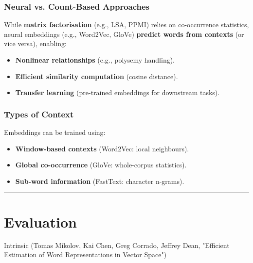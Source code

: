 \documentclass[
]{article}
\providecommand{\tightlist}{%
  \setlength{\itemsep}{0pt}\setlength{\parskip}{0pt}}
\begin{document}
\hypertarget{neural-vs.-count-based-approaches}{%
\subsubsection{\texorpdfstring{\textbf{Neural vs. Count-Based
Approaches}}{Neural vs. Count-Based Approaches}}\label{neural-vs.-count-based-approaches}}

While \textbf{matrix factorisation} (e.g., LSA, PPMI) relies on
co-occurrence statistics, neural embeddings (e.g., Word2Vec, GloVe)
\textbf{predict words from contexts} (or vice versa), enabling:

\begin{itemize}
\tightlist
\item
  \textbf{Nonlinear relationships} (e.g., polysemy handling).
\item
  \textbf{Efficient similarity computation} (cosine distance).
\item
  \textbf{Transfer learning} (pre-trained embeddings for downstream
  tasks).
\end{itemize}

\hypertarget{types-of-context}{%
\subsubsection{\texorpdfstring{\textbf{Types of
Context}}{Types of Context}}\label{types-of-context}}

Embeddings can be trained using:

\begin{itemize}
\tightlist
\item
  \textbf{Window-based contexts} (Word2Vec: local neighbours).
\item
  \textbf{Global co-occurrence} (GloVe: whole-corpus statistics).
\item
  \textbf{Sub-word information} (FastText: character n-grams).
\end{itemize}

\begin{center}\rule{0.5\linewidth}{0.5pt}\end{center}

\hypertarget{evaluation}{%
\section{Evaluation}\label{evaluation}}

Intrinsic (Tomas Mikolov, Kai Chen, Greg Corrado, Jeffrey Dean,
"Efficient Estimation of Word Representations in Vector Space")
\end{document}
